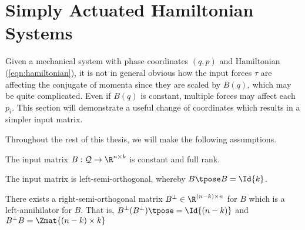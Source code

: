 \section{Simply Actuated Hamiltonian Systems}
Given a mechanical system with phase coordinates \((q,p)\) and Hamiltonian
(\ref{eqn:hamiltonian}), it is not in general obvious how the input forces
\(\tau\) are affecting the conjugate of momenta since they are scaled by
\(B(q)\), which may be quite complicated. Even if \(B(q)\) is constant, multiple
forces may affect each \(p_i\). This section will demonstrate a useful change of
coordinates which results in a simpler input matrix.

Throughout the rest of this thesis, we will make the following assumptions.
\begin{assm}\label{assm:B-const}
    The input matrix \(B : \mathcal{Q} \rightarrow \R^{n\times k}\) is constant
    and full rank.
\end{assm}
\begin{assm}\label{assm:B-orthogonal}
    The input matrix is left-semi-orthogonal, whereby \(B\tpose B = \Id{k}\).
\end{assm}
\begin{assm}\label{assm:B-perp}
    There exists a right-semi-orthogonal matrix 
    \(B^\perp \in \R^{(n-k)\times n}\) for \(B\)
    which is a left-annihilator for \(B\). That is,
    \(B^\perp(B^\perp)\tpose = \Id{(n-k)}\) and
    \(B^\perp B = \Zmat{(n-k) \times k}\) 
\end{assm}

